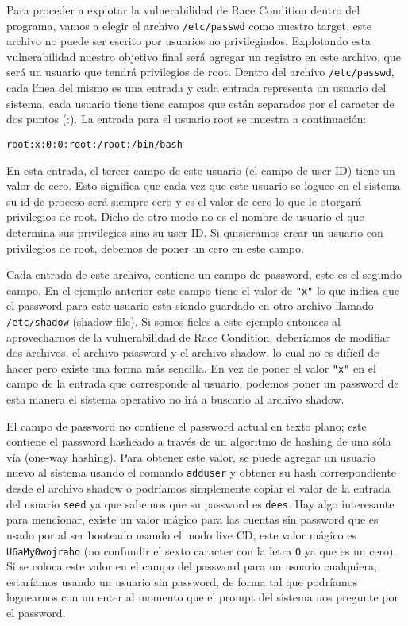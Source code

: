 Para proceder a explotar la vulnerabilidad de Race Condition dentro del programa, vamos a elegir el archivo \texttt{/etc/passwd} como nuestro target, este archivo no puede ser escrito por usuarios no privilegiados. Explotando esta vulnerabilidad nuestro objetivo final será agregar un registro en este archivo, que será un usuario que tendrá privilegios de root.
Dentro del archivo \texttt{/etc/passwd}, cada línea del mismo es una entrada y cada entrada representa un usuario del sistema, cada usuario tiene tiene campos que están separados por el caracter de dos puntos (:). La entrada para el usuario root se muestra a continuación:

\begin{lstlisting}
root:x:0:0:root:/root:/bin/bash
\end{lstlisting}

En esta entrada, el tercer campo de este usuario (el campo de user ID) tiene un valor de cero. Esto significa que cada vez que este usuario se loguee en el sistema su id de proceso será siempre cero y es el valor de cero lo que le otorgará privilegios de root. Dicho de otro modo no es el nombre de usuario el que determina sus privilegios sino su user ID. Si quisieramos crear un usuario con privilegios de root, debemos de poner un cero en este campo.

Cada entrada de este archivo, contiene un campo de password, este es el segundo campo. En el ejemplo anterior este campo tiene el valor de \texttt{"x"} lo que indica que el password para este usuario esta siendo guardado en otro archivo llamado \texttt{/etc/shadow} (shadow file). Si somos fieles a este ejemplo entonces al aprovecharnos de la vulnerabilidad de Race Condition, deberíamos de modifiar dos archivos, el archivo password y el archivo shadow, lo cual no es difícil de hacer pero existe una forma más sencilla. En vez de poner el valor \texttt{"x"} en el campo de la entrada que corresponde al usuario, podemos poner un password de esta manera el sistema operativo no irá a buscarlo al archivo shadow.

El campo de password no contiene el password actual en texto plano; este contiene el password hasheado a través de un algoritmo de hashing de una sóla vía (one-way hashing). Para obtener este valor, se puede agregar un usuario nuevo al sistema usando el comando  \texttt{adduser} y obtener su hash correspondiente desde el archivo shadow o podríamos simplemente copiar el valor de la entrada del usuario \texttt{seed} ya que sabemos que su password es  \texttt{dees}.
Hay algo interesante para mencionar, existe un valor mágico para las cuentas sin password que es usado por \ubuntu al ser booteado usando el modo live CD, este valor mágico es \texttt{U6aMy0wojraho} (no confundir el sexto caracter con la letra \texttt{O} ya que es un cero). Si se coloca este valor en el campo del password para un usuario cualquiera, estaríamos usando un usuario sin password, de forma tal que podríamos loguearnos con un enter al momento que el prompt del sistema nos pregunte por el password.

